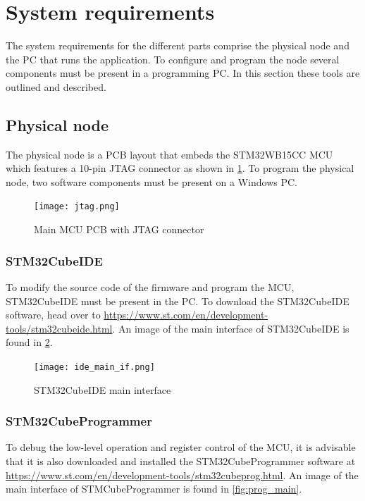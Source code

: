 \section{System requirements}

The system requirements for the different parts comprise the physical node and the PC that runs the application. To configure and program the node several components must be present in a programming PC. In this section these tools are outlined and described.

\subsection{Physical node}

The physical node is a PCB layout that embeds the STM32WB15CC MCU which features a 10-pin JTAG connector as shown in \cref{fig:jtag}.  To program the physical node, two software components must be present on a Windows PC.

\begin{figure}[ht]
	\centering
	\texttt{[image: jtag.png]}
	\caption{Main MCU PCB with JTAG connector \label{fig:jtag}}
\end{figure}

\subsubsection{STM32CubeIDE}

To modify the source code of the firmware and program the MCU, STM32CubeIDE must be present in the PC. To download the STM32CubeIDE software, head over to \url{https://www.st.com/en/development-tools/stm32cubeide.html}. An image of the main interface of STM32CubeIDE is found in \cref{fig:ide_main}.

\begin{figure}[ht]
	\centering
	\texttt{[image: ide\_main\_if.png]}
	\caption{STM32CubeIDE main interface \label{fig:ide_main}}
\end{figure}

\subsubsection{STM32CubeProgrammer}

To debug the low-level operation and register control of the MCU, it is advisable that it is also downloaded and installed the STM32CubeProgrammer software at \url{https://www.st.com/en/development-tools/stm32cubeprog.html}. An image of the main interface of STMCubeProgrammer is found in \cref{fig:prog_main}.

